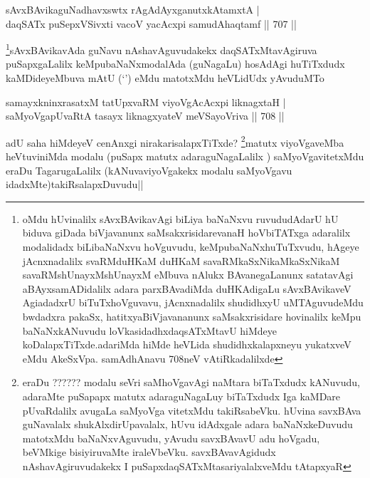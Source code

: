 
\begin{shl}
sAvxBAvikaguNadhavxswtx rAgAdAyxganutxkAtamxtA | \\
daqSATx puSepxVSivxti vacoV yacAcxpi samudAhaqtamf \hfill||  707 ||  
\end{shl}

\begin{artha}
\footnote{oMdu hUvinalilx sAvxBAvikavAgi biLiya baNaNxvu ruvududAdarU hU biduva giDada biVjavanunx saMsakxrisidarevanaH hoVbiTATxga adaralilx modalidadx biLibaNaNxvu hoVguvudu, keMpubaNaNxhuTuTxvudu, hAgeye jAcnxnadalilx svaRMduHKaM duHKaM savaRMkaSxNikaMkaSxNikaM savaRMshUnayxMshUnayxM eMbuva nAlukx BAvanegaLanunx satatavAgi aBAyxsamADidalilx adara parxBAvadiMda duHKAdigaLu sAvxBAvikaveV AgiadadxrU biTuTxhoVguvavu, jAcnxnadalilx shudidhxyU uMTAguvudeMdu bwdadxra pakaSx, hatitxyaBiVjavananunx saMsakxrisidare hovinalilx keMpu baNaNxkANuvudu loVkasidadhxdaqsATxMtavU hiMdeye koDalapxTiTxde.adariMda hiMde heVLida shudidhxkalapxneyu yukatxveV eMdu AkeSxVpa. samAdhAnavu 708neV vAtiRkadalilxde}sAvxBAvikavAda guNavu nAshavAguvudakekx daqSATxMtavAgiruva puSapxgaLalilx keMpubaNaNxmodalAda (guNagaLu) hosAdAgi huTiTxdudx kaMDideyeMbuva mAtU (`\stext') eMdu matotxMdu heVLidUdx yAvuduMTo
\end{artha}

\begin{shl}
samayxkninxrasatxM tatUpxvaRM viyoVgAcAcxpi liknagxtaH | \\
saMyoVgapUvaRtA tasayx liknagxyateV meVSayoVriva \hfill||  708 ||  
\end{shl}

\begin{artha}
adU saha hiMdeyeV cenAnxgi nirakarisalapxTiTxde? \footnote{eraDu ?????? modalu seVri saMhoVgavAgi naMtara biTaTxdudx kANuvudu, adaraMte puSapapx matutx adaraguNagaLuy biTaTxdudx Iga kaMDare pUvaRdalilx avugaLa saMyoVga vitetxMdu takiRsabeVku. hUvina savxBAva guNavalalx shukAlxdirUpavalalx, hUvu idAdxgale adara baNaNxkeDuvudu matotxMdu baNaNxvAguvudu, yAvudu savxBAvavU adu hoVgadu, beVMkige bisiyiruvaMte iraleVbeVku. savxBAvavAgidudx nAshavAgiruvudakekx I puSapxdaqSATxMtasariyalalxveMdu tAtapxyaR}matutx viyoVgaveMba heVtuviniMda modalu (puSapx matutx adaraguNagaLalilx ) saMyoVgavitetxMdu eraDu TagarugaLalilx (kANuvaviyoVgakekx modalu saMyoVgavu idadxMte)takiRsalapxDuvudu||
\end{artha}


